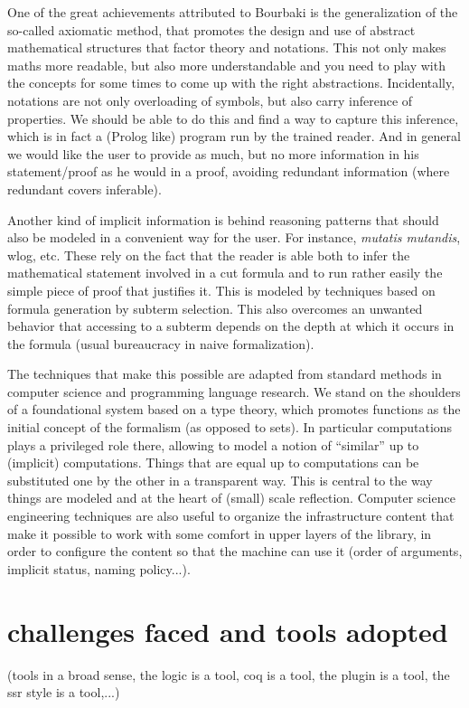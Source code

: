 One of the great achievements attributed to Bourbaki is the
generalization of the so-called axiomatic method, that promotes the
design and use of abstract mathematical structures that factor theory
and notations. This not only makes maths more readable, but also more
understandable and you need to play with the concepts for some times
to come up with the right abstractions. Incidentally, notations are
not only overloading of symbols, but also carry inference of
properties. We should be able to do this and find a way to capture this
inference, which is in fact a (Prolog like) program run by the trained
reader. And in general we would like the user to provide as much, but
no more information in his statement/proof as he would in a proof,
avoiding redundant information (where redundant covers inferable).

Another kind of implicit information is behind reasoning patterns that should also
be modeled in a convenient way for the user. For instance,
\emph{mutatis mutandis}, wlog, etc. These rely on the fact that the
reader is able both to infer the mathematical statement involved in a
cut formula and to run rather easily the simple piece of proof that
justifies it. This is modeled by techniques based on formula generation
by subterm selection. This also overcomes an unwanted behavior that
accessing to a subterm depends on the depth at which it occurs in the
formula (usual bureaucracy in naive formalization).

The techniques that make this possible are adapted from standard
methods in computer science and programming language research. We stand on the
shoulders of a foundational system based on a type theory, which
promotes functions as the initial concept of the formalism (as opposed
to sets). In particular computations plays a privileged role there,
allowing to model a notion of ``similar'' up to (implicit)
computations. Things that are equal up to computations can be
substituted one by the other in a transparent way. This is central to
the way things are modeled and at the heart of (small) scale
reflection. Computer science engineering techniques are also useful
to organize the infrastructure content that make it possible to work with
some comfort in upper layers of the library, in order to configure
the content so that the machine can use it (order of arguments,
implicit status, naming policy...).





\section{challenges faced and tools adopted}
(tools in a broad sense, the logic is a tool, coq is a tool, the plugin
is a tool, the ssr style is a tool,...)

